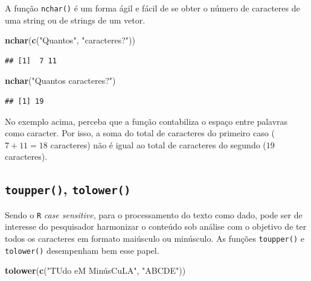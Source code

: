 \documentclass[]{book}
\newenvironment{Shaded}{\begin{snugshade}}{\end{snugshade}}
\newcommand{\KeywordTok}[1]{\textcolor[rgb]{0.13,0.29,0.53}{\textbf{#1}}}
\newcommand{\NormalTok}[1]{#1}
\newcommand{\StringTok}[1]{\textcolor[rgb]{0.31,0.60,0.02}{#1}}
\begin{document}
A função \texttt{nchar()} é um forma ágil e fácil de se obter o número de caracteres de uma string ou de strings de um vetor.

\begin{Shaded}
\begin{Highlighting}[]
\KeywordTok{nchar}\NormalTok{(}\KeywordTok{c}\NormalTok{(}\StringTok{"Quantos"}\NormalTok{, }\StringTok{"caracteres?"}\NormalTok{))}
\end{Highlighting}
\end{Shaded}

\begin{verbatim}
## [1]  7 11
\end{verbatim}

\begin{Shaded}
\begin{Highlighting}[]
\KeywordTok{nchar}\NormalTok{(}\StringTok{"Quantos caracteres?"}\NormalTok{)}
\end{Highlighting}
\end{Shaded}

\begin{verbatim}
## [1] 19
\end{verbatim}

No exemplo acima, perceba que a função contabiliza o espaço entre palavras como caracter. Por isso, a soma do total de caracteres do primeiro caso (\(7 + 11 = 18\) caracteres) não é igual ao total de caracteres do segundo (\(19\) caracteres).

\hypertarget{toupper-tolower}{%
\subsection{\texorpdfstring{\texttt{toupper()}, \texttt{tolower()}}{toupper(), tolower()}}\label{toupper-tolower}}

Sendo o \texttt{R} \emph{case sensitive}, para o processamento do texto como dado, pode ser de interesse do pesquisador harmonizar o conteúdo sob análise com o objetivo de ter todos os caracteres em formato maiúsculo ou minúsculo. As funções \texttt{toupper()} e \texttt{tolower()} desempenham bem esse papel.

\begin{Shaded}
\begin{Highlighting}[]
\KeywordTok{tolower}\NormalTok{(}\KeywordTok{c}\NormalTok{(}\StringTok{"TUdo eM MinúsCuLA", "}\NormalTok{ABCDE}\StringTok{"))}
\end{Highlighting}
\end{Shaded}
\end{document}
